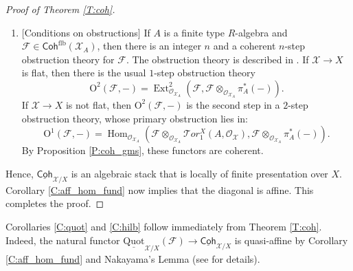 \documentclass[a4paper]{amsart}
\theoremstyle{plain}
\theoremstyle{definition}
\theoremstyle{remark}
\numberwithin{equation}{section}
\newcommand\cF{\mathcal{F}}
\newcommand\cX{\mathcal{X}}
\newcommand\oh{\mathcal{O}}
\newcommand\Coh{\mathsf{Coh}}
\newcommand\Mod{\mathsf{Mod}}
\newcommand\Ab{\mathsf{Ab}}
\DeclareMathOperator{\Aut}{Aut}
\DeclareMathOperator{\Def}{Def}
\DeclareMathOperator{\Hom}{Hom}
\DeclareMathOperator{\Ext}{Ext}
\newcommand{\shv}[1]{\mathcal{{#1}}}
\begin{document}
\begin{proof} [Proof of Theorem \ref{T:coh}]
\begin{enumerate}
    automorphism and deformation functors associated to $\shv{F}$ are
    coherent. It is established in
    \cite[\S8]{hallj_openness_coh} that as additive functors from $\Mod(A) \to \Ab$:
    \begin{align*}
      \Aut_{\underline{\Coh}_{\cX/X}}(\shv{F},-) &= \Hom_{\oh_{\cX_A}}(\shv{F},\shv{F} \otimes_{\oh_{\cX_A}} \pi_A^*(-))\quad \mbox{and}\\
      \Def_{\underline{\Coh}_{\cX/X}}(\shv{F},-) &= \Ext^1_{\oh_{\cX_A}}(\shv{F},\shv{F} \otimes_{\oh_{\cX_A}} \pi_A^*(-)).
    \end{align*}
    By Proposition \ref{P:coh_gms}, the functors above are coherent. 
  \item {[Conditions on obstructions]} If $A$ is a finite type $R$-algebra and $\shv{F} \in \Coh^{\mathrm{flb}}(\cX_A)$, then there is an integer $n$ and a coherent $n$-step obstruction theory for $\shv{F}$. The obstruction theory is described in \cite[\S8]{hallj_openness_coh}. If $\cX \to X$ is flat, then there is the usual $1$-step obstruction theory
    \[
      \mathrm{O}^2(\shv{F},-) = \Ext^2_{\oh_{\cX_A}}(\shv{F},\shv{F} \otimes_{\oh_{\cX_A}} \pi_A^*(-)).
    \]
    If $\cX \to X$ is not flat, then $\mathrm{O}^2(\shv{F},-)$ is the second step in a $2$-step obstruction theory, whose primary obstruction lies in:
    \[
      \mathrm{O}^1(\shv{F},-) = \Hom_{\oh_{\cX_A}}(\shv{F} \otimes_{\oh_{\cX_A}} \shv{T}or_1^{X}(A,\oh_{\cX}),\shv{F} \otimes_{\oh_{\cX_A}} \pi_A^*(-)).
    \]
    By Proposition \ref{P:coh_gms}, these functors are coherent.
  \end{enumerate}
  Hence, $\underline{\Coh}_{\cX/X}$ is an algebraic stack that is
  locally of finite presentation over $X$. Corollary
  \ref{C:aff_hom_fund} now implies that the diagonal is affine. This completes the proof. 
\end{proof}

Corollaries \ref{C:quot} and \ref{C:hilb} follow immediately from Theorem \ref{T:coh}. Indeed, the natural functor
$\underline{\mathrm{Quot}}_{\cX/X}(\cF)\to \underline{\Coh}_{\cX/X}$ is quasi-affine by Corollary \ref{C:aff_hom_fund} and Nakayama's Lemma (see \cite[Lem.~2.6]{lieblich-coherent} for details). 
\end{document}
